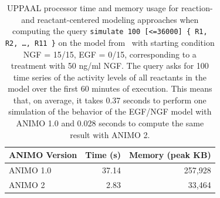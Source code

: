 \documentclass{bmcart}
\def\animo2{ANIMO 2}
\begin{document}
\begin{backmatter}
\begin{table}[h!]
\scriptsize
  \begin{center}
  \begin{tabular}{|l||r|r|}
    \hline
    ANIMO Version & Time (s) & Memory (peak KB) \\
    \hline
    \hline
    ANIMO 1.0 & 37.14 & 257,928 \\
    \hline
    \animo2{} & 2.83 & 33,464 \\
    \hline
  \end{tabular}
  \end{center}
  \caption{UPPAAL processor time and memory usage for reaction- and reactant-centered modeling approaches when computing
  the query {\tt simulate 100 [<=36000] \{ R1, R2, \dots, R11 \}} on the model from~\cite{animo-bibe} with starting condition
  NGF = 15/15, EGF = 0/15, corresponding to a treatment with 50 ng/ml NGF.
  The query asks for 100 time series of the activity levels of all reactants in the model over the first 60 minutes
  of execution. This means that, on average, it takes 0.37 seconds to perform one simulation of the behavior
  of the EGF/NGF model with ANIMO 1.0 and 0.028 seconds to compute the same result with \animo2{}.\label{tab:sim-100}}
\end{table}




\end{backmatter}
\end{document}
